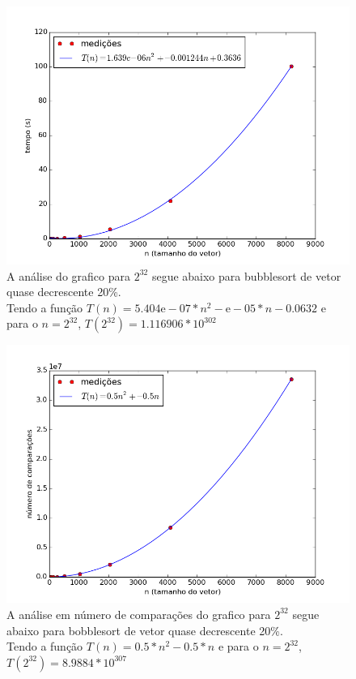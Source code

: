 \documentclass[12pt,a4paper,twoside]{report}
\begin{document}


\begin{figure}[ht]
\centering \includegraphics[scale=0.8]{../bolha/imagens/bolhaQuaseDecresc200.png}
\caption{A análise do grafico para $2^{32}$ segue abaixo para bubblesort de vetor quase decrescente 20\%.\\
Tendo a função $T(n) = 5.404\mathrm{e}-07*n^2-\mathrm{e}-05*n-0.0632$ e para o $n =2^{32}$, $T(2^{32}) = 1.116906 * 10^{302}$}
\label{fig:bolhaQuaseDecresc200}
\end{figure}

\begin{figure}[ht]
\centering \includegraphics[scale=0.8]{../bolha/imagens/bolhaQuaseDecresc201.png}
\caption{A análise em número de comparações do grafico para $2^{32}$ segue abaixo para bobblesort de vetor quase decrescente 20\%.\\
Tendo a função $T(n) = 0.5*n^2 - 0.5*n$ e para o $n =2^{32}$, $T(2^{32}) = 8.9884 * 10^{307}$}
\label{fig:bolhaQuaseDecresc201}
\end{figure}
\end{document}
